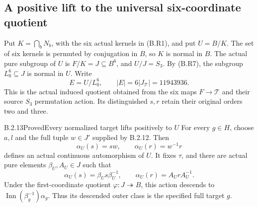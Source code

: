 \subsection{A positive lift to the universal six-coordinate quotient}

Put $K=\bigcap_b N_b$, with the six actual kernels in (B.R1),
and put $U=B/K$.  The set of six kernels is permuted by
conjugation in $B$, so $K$ is normal in $B$.  The actual
pure subgroup of $U$ is $F/K=J\subseteq B^6$, and
$U/J=S_3$.  By (B.R7), the subgroup $L_0^6\subseteq J$
is normal in $U$.  Write
\[
 E=U/L_0^6,\qquad |E|=6|J_{\mathcal T}|=11943936.                \tag{B.R14}
\]
This is the actual induced quotient obtained from the six
maps $F\to\mathcal T$ and their source $S_3$ permutation
action.  Its distinguished $s,r$ retain their original
orders two and three.

\begin{result}{B.2.13}{Proved}{Every normalized target lifts positively to $U$}
For every $g\in H$, choose $a,l$ and the full tuple $w\in J'$
supplied by B.2.12.  Then
\[
 \alpha_U(s)=sw,\qquad\alpha_U(r)=w^{-1}r                     \tag{B.R15}
\]
defines an actual continuous automorphism of $U$.  It fixes
$\tau$, and there are actual pure elements $\beta_U,A_U\in J$
such that
\[
 \alpha_U(s)=\beta_U s\beta_U^{-1},\qquad
 \alpha_U(r)=A_UrA_U^{-1}.                                    \tag{B.R16}
\]
Under the first-coordinate quotient $\varphi:J\twoheadrightarrow
B$, this action descends to
$\operatorname{Inn}(\beta_g^{-1})\alpha_g$.  Thus its
descended outer class is the specified full target $g$.
\end{result}

